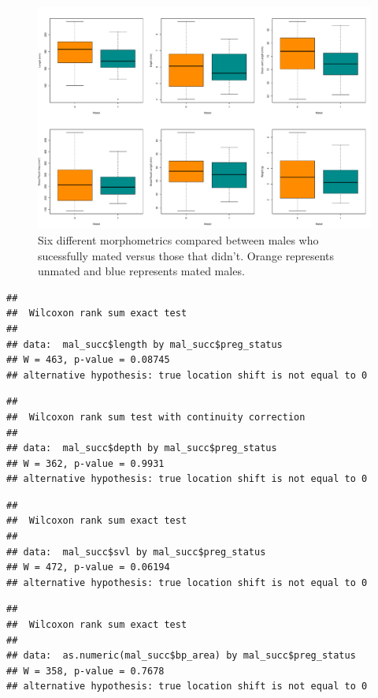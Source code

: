\documentclass[
]{article}
\begin{document}
\begin{figure}
\centering
\includegraphics{selection_analysis_floridae_files/figure-latex/mat-status-morph-mal-1.pdf}
\caption{\label{fig:mat-status-morph-mal}Six different morphometrics compared between males who sucessfully mated versus those that didn't. Orange represents unmated and blue represents mated males.}
\end{figure}

\begin{verbatim}
## 
##  Wilcoxon rank sum exact test
## 
## data:  mal_succ$length by mal_succ$preg_status
## W = 463, p-value = 0.08745
## alternative hypothesis: true location shift is not equal to 0
\end{verbatim}

\begin{verbatim}
## 
##  Wilcoxon rank sum test with continuity correction
## 
## data:  mal_succ$depth by mal_succ$preg_status
## W = 362, p-value = 0.9931
## alternative hypothesis: true location shift is not equal to 0
\end{verbatim}

\begin{verbatim}
## 
##  Wilcoxon rank sum exact test
## 
## data:  mal_succ$svl by mal_succ$preg_status
## W = 472, p-value = 0.06194
## alternative hypothesis: true location shift is not equal to 0
\end{verbatim}

\begin{verbatim}
## 
##  Wilcoxon rank sum exact test
## 
## data:  as.numeric(mal_succ$bp_area) by mal_succ$preg_status
## W = 358, p-value = 0.7678
## alternative hypothesis: true location shift is not equal to 0
\end{verbatim}
\end{document}
